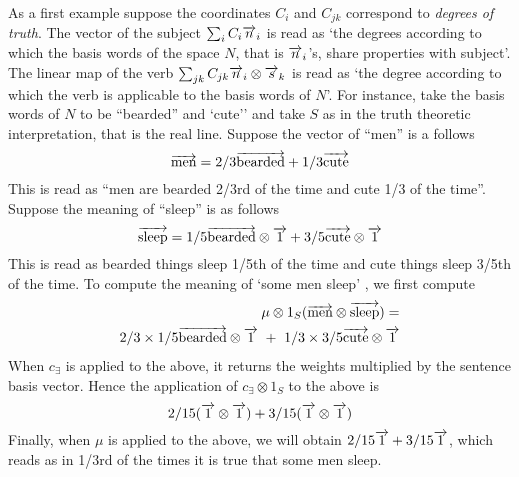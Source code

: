 As a first example suppose the coordinates $C_i$ and $C_{jk}$ correspond to \emph{degrees of truth}. The vector of the subject $\sum_i C_i \overrightarrow{n}_i$ is read as `the degrees according to which the basis words of the space $N$, that is   $\overrightarrow{n}_i$'s,  share properties with subject'.  The linear map of the verb $\sum_{jk} C_{jk} \overrightarrow{n}_i \otimes \overrightarrow{s}_k$ is read as `the degree according to which the verb is applicable to  the basis words of $N$'. For instance, take the basis words of $N$ to be ``bearded'' and `cute'' and take $S$ as in the truth theoretic interpretation, that is the real line.  Suppose the vector of ``men'' is a follows
\[
\overrightarrow{\text{men}} = 2/3 \overrightarrow{\text{bearded}} + 1/3 \overrightarrow{\text{cute}}
\]
This is read as ``men are  bearded 2/3rd of the time and cute 1/3 of the time''. Suppose the meaning of ``sleep'' is as follows
\[
\overrightarrow{\text{sleep}} = 1/5 \overrightarrow{\text{bearded}} \otimes \overrightarrow{1}  + 3/5 \overrightarrow{\text{cute}} \otimes \overrightarrow{1}
\]
This is read as bearded things sleep 1/5th of the time  and cute things sleep 3/5th of the time. To compute the meaning of `some men sleep' , we first compute
\begin{align*}
\mu \otimes 1_S (\ov{\text{men}} \otimes \ov{\text{sleep}}) = &\\
2/3 \times 1/5 \ov{\text{bearded}} \otimes \ov{1} \ + \ 
1/3\times 3/5\ov{\text{cute}} \otimes \ov{1}&
\end{align*}
When $c_{\exists}$ is applied to the above, it returns the weights multiplied by the sentence basis vector. Hence the application of $c_{\exists} \otimes 1_S$ to the above  is 
\[
2/15 (\overrightarrow{1} \otimes \overrightarrow{1})+ 3/15 (\overrightarrow{1} \otimes \overrightarrow{1})
\]
Finally, when $\mu$ is applied to the above, we will obtain  $2/15 \overrightarrow{1} + 3/15 \overrightarrow{1}$, which reads as in 1/3rd of the times it is true that some men sleep. 

